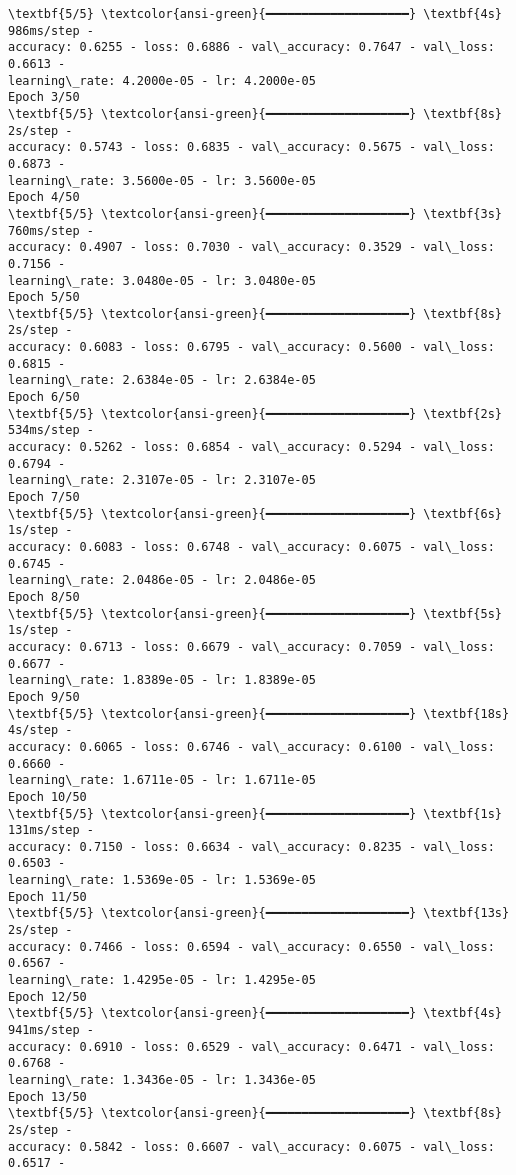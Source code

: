 \documentclass[11pt]{article}
\begin{document}
    \begin{Verbatim}[commandchars=\\\{\}]
\textbf{5/5} \textcolor{ansi-green}{━━━━━━━━━━━━━━━━━━━━} \textbf{4s} 986ms/step -
accuracy: 0.6255 - loss: 0.6886 - val\_accuracy: 0.7647 - val\_loss: 0.6613 -
learning\_rate: 4.2000e-05 - lr: 4.2000e-05
Epoch 3/50
\textbf{5/5} \textcolor{ansi-green}{━━━━━━━━━━━━━━━━━━━━} \textbf{8s} 2s/step -
accuracy: 0.5743 - loss: 0.6835 - val\_accuracy: 0.5675 - val\_loss: 0.6873 -
learning\_rate: 3.5600e-05 - lr: 3.5600e-05
Epoch 4/50
\textbf{5/5} \textcolor{ansi-green}{━━━━━━━━━━━━━━━━━━━━} \textbf{3s} 760ms/step -
accuracy: 0.4907 - loss: 0.7030 - val\_accuracy: 0.3529 - val\_loss: 0.7156 -
learning\_rate: 3.0480e-05 - lr: 3.0480e-05
Epoch 5/50
\textbf{5/5} \textcolor{ansi-green}{━━━━━━━━━━━━━━━━━━━━} \textbf{8s} 2s/step -
accuracy: 0.6083 - loss: 0.6795 - val\_accuracy: 0.5600 - val\_loss: 0.6815 -
learning\_rate: 2.6384e-05 - lr: 2.6384e-05
Epoch 6/50
\textbf{5/5} \textcolor{ansi-green}{━━━━━━━━━━━━━━━━━━━━} \textbf{2s} 534ms/step -
accuracy: 0.5262 - loss: 0.6854 - val\_accuracy: 0.5294 - val\_loss: 0.6794 -
learning\_rate: 2.3107e-05 - lr: 2.3107e-05
Epoch 7/50
\textbf{5/5} \textcolor{ansi-green}{━━━━━━━━━━━━━━━━━━━━} \textbf{6s} 1s/step -
accuracy: 0.6083 - loss: 0.6748 - val\_accuracy: 0.6075 - val\_loss: 0.6745 -
learning\_rate: 2.0486e-05 - lr: 2.0486e-05
Epoch 8/50
\textbf{5/5} \textcolor{ansi-green}{━━━━━━━━━━━━━━━━━━━━} \textbf{5s} 1s/step -
accuracy: 0.6713 - loss: 0.6679 - val\_accuracy: 0.7059 - val\_loss: 0.6677 -
learning\_rate: 1.8389e-05 - lr: 1.8389e-05
Epoch 9/50
\textbf{5/5} \textcolor{ansi-green}{━━━━━━━━━━━━━━━━━━━━} \textbf{18s} 4s/step -
accuracy: 0.6065 - loss: 0.6746 - val\_accuracy: 0.6100 - val\_loss: 0.6660 -
learning\_rate: 1.6711e-05 - lr: 1.6711e-05
Epoch 10/50
\textbf{5/5} \textcolor{ansi-green}{━━━━━━━━━━━━━━━━━━━━} \textbf{1s} 131ms/step -
accuracy: 0.7150 - loss: 0.6634 - val\_accuracy: 0.8235 - val\_loss: 0.6503 -
learning\_rate: 1.5369e-05 - lr: 1.5369e-05
Epoch 11/50
\textbf{5/5} \textcolor{ansi-green}{━━━━━━━━━━━━━━━━━━━━} \textbf{13s} 2s/step -
accuracy: 0.7466 - loss: 0.6594 - val\_accuracy: 0.6550 - val\_loss: 0.6567 -
learning\_rate: 1.4295e-05 - lr: 1.4295e-05
Epoch 12/50
\textbf{5/5} \textcolor{ansi-green}{━━━━━━━━━━━━━━━━━━━━} \textbf{4s} 941ms/step -
accuracy: 0.6910 - loss: 0.6529 - val\_accuracy: 0.6471 - val\_loss: 0.6768 -
learning\_rate: 1.3436e-05 - lr: 1.3436e-05
Epoch 13/50
\textbf{5/5} \textcolor{ansi-green}{━━━━━━━━━━━━━━━━━━━━} \textbf{8s} 2s/step -
accuracy: 0.5842 - loss: 0.6607 - val\_accuracy: 0.6075 - val\_loss: 0.6517 -

\end{Verbatim}
\end{document}
